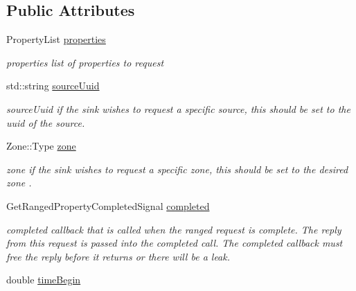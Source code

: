 \subsection*{Public Attributes}
\begin{DoxyCompactItemize}
\item 
\hypertarget{classAsyncRangePropertyRequest_afd6f95a06376fef905faf5ab1b580bc9}{Property\-List \hyperlink{classAsyncRangePropertyRequest_afd6f95a06376fef905faf5ab1b580bc9}{properties}}\label{classAsyncRangePropertyRequest_afd6f95a06376fef905faf5ab1b580bc9}

\begin{DoxyCompactList}\small\item\em properties list of properties to request \end{DoxyCompactList}\item 
\hypertarget{classAsyncRangePropertyRequest_a626258d5d401e0598d619b84600689f9}{std\-::string \hyperlink{classAsyncRangePropertyRequest_a626258d5d401e0598d619b84600689f9}{source\-Uuid}}\label{classAsyncRangePropertyRequest_a626258d5d401e0598d619b84600689f9}

\begin{DoxyCompactList}\small\item\em source\-Uuid if the sink wishes to request a specific source, this should be set to the uuid of the source. \end{DoxyCompactList}\item 
\hypertarget{classAsyncRangePropertyRequest_a045f1320e9152de5e97f0b4de5c061da}{Zone\-::\-Type \hyperlink{classAsyncRangePropertyRequest_a045f1320e9152de5e97f0b4de5c061da}{zone}}\label{classAsyncRangePropertyRequest_a045f1320e9152de5e97f0b4de5c061da}

\begin{DoxyCompactList}\small\item\em zone if the sink wishes to request a specific zone, this should be set to the desired zone . \end{DoxyCompactList}\item 
\hypertarget{classAsyncRangePropertyRequest_a81777a8e0304bd6929c05d39c650454d}{Get\-Ranged\-Property\-Completed\-Signal \hyperlink{classAsyncRangePropertyRequest_a81777a8e0304bd6929c05d39c650454d}{completed}}\label{classAsyncRangePropertyRequest_a81777a8e0304bd6929c05d39c650454d}

\begin{DoxyCompactList}\small\item\em completed callback that is called when the ranged request is complete. The reply from this request is passed into the completed call. The completed callback must free the reply before it returns or there will be a leak. \end{DoxyCompactList}\item 
\hypertarget{classAsyncRangePropertyRequest_a2dc2927f6c771707f15a767358a58e69}{double \hyperlink{classAsyncRangePropertyRequest_a2dc2927f6c771707f15a767358a58e69}{time\-Begin}}\label{classAsyncRangePropertyRequest_a2dc2927f6c771707f15a767358a58e69}


\end{DoxyCompactItemize}
